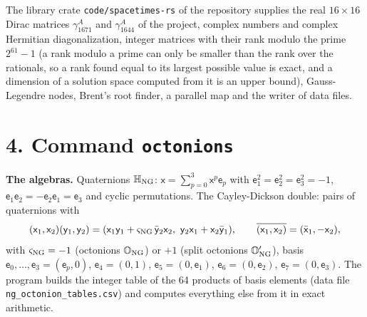 \documentclass[
  10pt,
]{article}
\begin{document}
The library crate \texttt{code/spacetimes-rs} of the repository supplies
the real \(16\times16\) Dirac matrices \(\gamma^A_{1671}\) and
\(\gamma^A_{1644}\) of the project, complex numbers and complex
Hermitian diagonalization, integer matrices with their rank modulo the
prime \(2^{61}-1\) (a rank modulo a prime can only be smaller than the
rank over the rationals, so a rank found equal to its largest possible
value is exact, and a dimension of a solution space computed from it is
an upper bound), Gauss-Legendre nodes, Brent's root finder, a parallel
map and the writer of data files.

\hypertarget{command-octonions}{%
\section{\texorpdfstring{4. Command
\texttt{octonions}}{4. Command octonions}}\label{command-octonions}}

\textbf{The algebras.} Quaternions \(\mathbb H_{\rm NG}\):
\(\mathsf x=\sum_{p=0}^3\mathsf x^p\mathsf e_p\) with
\(\mathsf e_1^2=\mathsf e_2^2=\mathsf e_3^2=-1\),
\(\mathsf e_1\mathsf e_2=-\mathsf e_2\mathsf e_1=\mathsf e_3\) and
cyclic permutations. The Cayley-Dickson double: pairs of quaternions
with
\[(\mathsf x_1,\mathsf x_2)(\mathsf y_1,\mathsf y_2)=(\mathsf x_1\mathsf y_1+\varsigma_{\rm NG}\,\bar{\mathsf y}_2\mathsf x_2,\ \mathsf y_2\mathsf x_1+\mathsf x_2\bar{\mathsf y}_1),\qquad \overline{(\mathsf x_1,\mathsf x_2)}=(\bar{\mathsf x}_1,-\mathsf x_2),\]
with \(\varsigma_{\rm NG}=-1\) (octonions \(\mathbb O_{\rm NG}\)) or
\(+1\) (split octonions \(\mathbb O'_{\rm NG}\)), basis
\(\mathsf e_0,\dots,\mathsf e_3=(\mathsf e_p,0)\),
\(\mathsf e_4=(0,1)\), \(\mathsf e_5=(0,\mathsf e_1)\),
\(\mathsf e_6=(0,\mathsf e_2)\), \(\mathsf e_7=(0,\mathsf e_3)\). The
program builds the integer table of the 64 products of basis elements
(data file \texttt{ng\_octonion\_tables.csv}) and computes everything
else from it in exact arithmetic.
\end{document}
